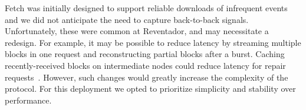 
Fetch was initially designed to support reliable downloads of infrequent
events and we did not anticipate the need to capture back-to-back signals.
Unfortunately, these were common at Reventador, and may necessitate a
redesign. For example, it may be possible to reduce latency by streaming
multiple blocks in one request and reconstructing partial blocks after a
burst. Caching recently-received blocks on intermediate nodes could reduce
latency for repair requests~\cite{netshm-emnets05}.  However, such changes
would greatly increase the complexity of the protocol. For this deployment
we opted to prioritize simplicity and stability over performance.



